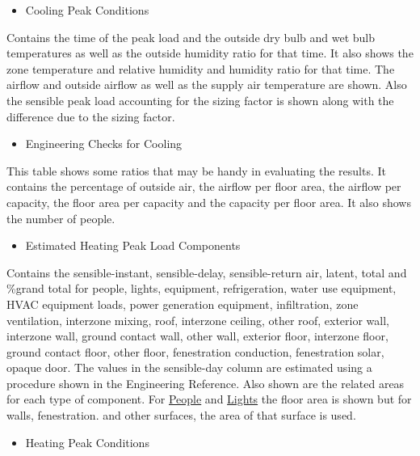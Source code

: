 \begin{itemize}
\tightlist
\item
  Cooling Peak Conditions
\end{itemize}

Contains the time of the peak load and the outside dry bulb and wet bulb temperatures as well as the outside humidity ratio for that time. It also shows the zone temperature and relative humidity and humidity ratio for that time. The airflow and outside airflow as well as the supply air temperature are shown. Also the sensible peak load accounting for the sizing factor is shown along with the difference due to the sizing factor.

\begin{itemize}
\tightlist
\item
  Engineering Checks for Cooling
\end{itemize}

This table shows some ratios that may be handy in evaluating the results. It contains the percentage of outside air, the airflow per floor area, the airflow per capacity, the floor area per capacity and the capacity per floor area. It also shows the number of people.


\begin{itemize}
\tightlist
\item
  Estimated Heating Peak Load Components
\end{itemize}

Contains the sensible-instant, sensible-delay, sensible-return air, latent, total and \%grand total for people, lights, equipment, refrigeration, water use equipment, HVAC equipment loads, power generation equipment, infiltration, zone ventilation, interzone mixing, roof, interzone ceiling, other roof, exterior wall, interzone wall, ground contact wall, other wall, exterior floor, interzone floor, ground contact floor, other floor, fenestration conduction, fenestration solar, opaque door. The values in the sensible-day column are estimated using a procedure shown in the Engineering Reference. Also shown are the related areas for each type of component. For \hyperref[people]{People} and \hyperref[lights-000]{Lights} the floor area is shown but for walls, fenestration. and other surfaces, the area of that surface is used.

\begin{itemize}
\tightlist
\item
  Heating Peak Conditions
\end{itemize}


